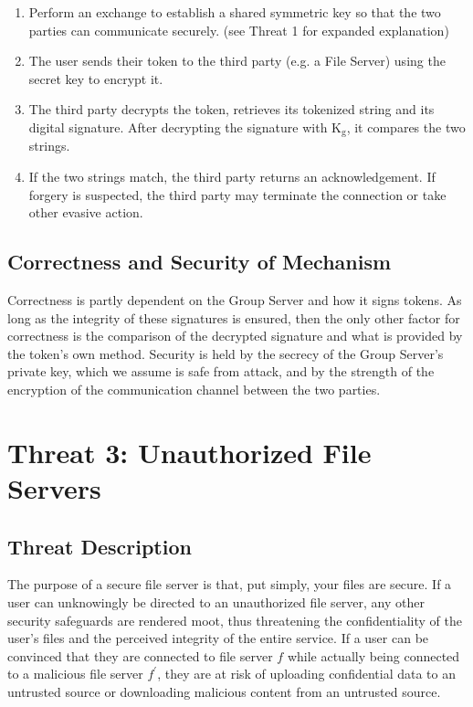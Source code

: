 \documentclass[11pt]{article}
\begin{document}
\begin{enumerate}
\item{}Perform an exchange to establish a shared symmetric key so that the two parties can communicate securely. (see Threat 1 for expanded explanation)
\item{}The user sends their token to the third party (e.g. a File Server) using the secret key to encrypt it.
\item{}The third party decrypts the token, retrieves its tokenized string and its digital signature. After decrypting the signature with K$_\text{g}$, it compares the two strings.
\item{}If the two strings match, the third party returns an acknowledgement. If forgery is suspected, the third party may terminate the connection or take other evasive action.
\end{enumerate}
\subsection{Correctness and Security of Mechanism}
Correctness is partly dependent on the Group Server and how it signs tokens. As long as the integrity of these signatures is ensured, then the only other factor for correctness is the comparison of the decrypted signature and what is provided by the token's own method. Security is held by the secrecy of the Group Server's private key, which we assume is safe from attack, and by the strength of the encryption of the communication channel between the two parties.
\section{Threat 3: Unauthorized File Servers}
\subsection{Threat Description}
The purpose of a secure file server is that, put simply, your files are secure. If a user can unknowingly be directed to an unauthorized file server, any other security safeguards are rendered moot, thus threatening the confidentiality of the user's files and the perceived integrity of the entire service. If a user can be convinced that they are connected to file server $f$ while actually being connected to a malicious file server $f^\prime$, they are at risk of uploading confidential data to an untrusted source or downloading malicious content from an untrusted source.
\end{document}
